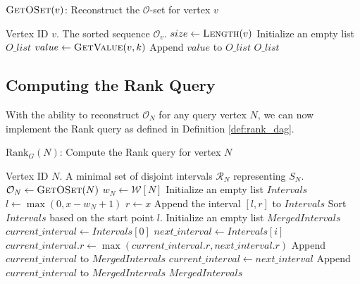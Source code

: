 \begin{algorithm}
    \caption{$\textsc{GetOSet}(v)$: Reconstruct the $\mathcal{O}$-set for vertex $v$}
    \label{alg:get_o_set}
    \small
    \begin{algorithmic}[1]
        \Require Vertex ID $v$.
        \Ensure The sorted sequence $\mathcal{O}_v$.
        \State $size \gets \textsc{Length}(v)$
        \State Initialize an empty list $O\_list$
        \State $value \gets \textsc{GetValue}(v, k)$
        \State Append $value$ to $O\_list$
        \EndFor
        \State \Return $O\_list$ 
    \end{algorithmic}
\end{algorithm}


\subsection{Computing the Rank Query}
\label{subsec:computing_rank}

With the ability to reconstruct $\mathcal{O}_N$ for any query vertex $N$, we can now implement the Rank query as defined in Definition \ref{def:rank_dag}.

\begin{algorithm}
    \caption{$\mathrm{Rank}_G(N)$: Compute the Rank query for vertex $N$}
    \label{alg:rank_dag}
    \small %
    \begin{algorithmic}[1]
        \Require Vertex ID $N$.
        \Ensure A minimal set of disjoint intervals $\mathcal{R}_N$ representing $S_N$.
        \State $\mathcal{O}_N \gets \textsc{GetOSet}(N)$
        \State $w_N \gets \mathcal{W}[N]$
        \State Initialize an empty list $Intervals$
        \State $l \gets \max(0, x - w_N + 1)$
        \State $r \gets x$
         
        \State Append the interval $[l, r]$ to $Intervals$
        \EndIf
        \EndFor
        \State Sort $Intervals$ based on the start point $l$.
        \State Initialize an empty list $MergedIntervals$
        \State $current\_interval \gets Intervals[0]$
        \State $next\_interval \gets Intervals[i]$
        \State $current\_interval.r \gets \max(current\_interval.r, next\_interval.r)$
        \Else
        \State Append $current\_interval$ to $MergedIntervals$
        \State $current\_interval \gets next\_interval$
        \EndIf
        \EndFor
        \State Append $current\_interval$ to $MergedIntervals$
        \EndIf
        \State \Return $MergedIntervals$
    \end{algorithmic}
\end{algorithm}

